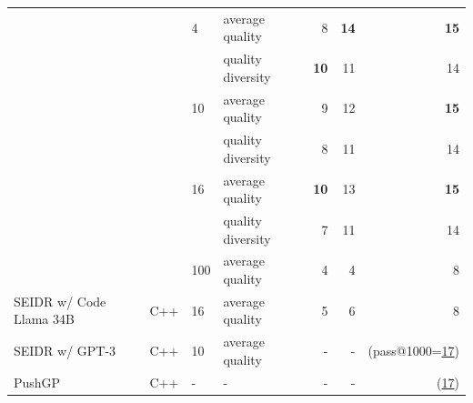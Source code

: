 \begin{table}[htb]
\begin{adjustbox}{max width=\textwidth}
\begin{tabular}{llllrrr}
  &     & 4   & average quality &       8 &       \textbf{14} &        \textbf{15} \\
  &     &     & quality diversity  &      \textbf{10} &       11 &        14 \\
  &     & 10  & average quality &       9 &       12 &        \textbf{15} \\
  &     &     & quality diversity  &       8 &       11 &        14 \\
  &     & 16  & average quality &      \textbf{10} &       13 &        \textbf{15} \\
  &     &     & quality diversity  &       7 &       11 &        14 \\
  &     & 100 & average quality &       4 &        4 &         8 \\
  \midrule
SEIDR w/ Code Llama 34B & C++ &  16  & average quality  &    5 &        6 &         8 \\
SEIDR w/ GPT-3 & C++  & 10 & average quality &       - &        - &      (pass@1000=\underline{17})\\
\midrule
PushGP & C++ &  -   &    -            &       - &        - &      (\underline{17})\\

\bottomrule
\end{tabular}
\end{adjustbox}
\end{table}




